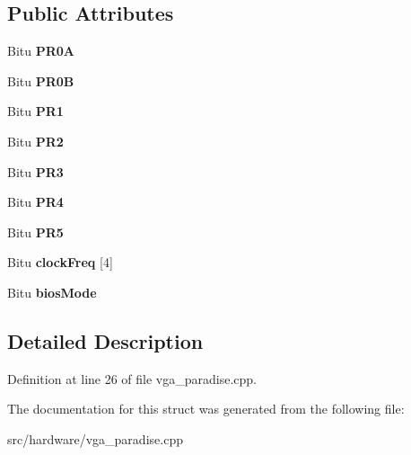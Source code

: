 \subsection*{Public Attributes}
\begin{DoxyCompactItemize}
\item 
\hypertarget{structSVGA__PVGA1A__DATA_a8ef7f27e409d76b2abf935961370d13b}{Bitu {\bfseries P\-R0\-A}}\label{structSVGA__PVGA1A__DATA_a8ef7f27e409d76b2abf935961370d13b}

\item 
\hypertarget{structSVGA__PVGA1A__DATA_a37c1495fe2b96b3e0ee3f22878b30aee}{Bitu {\bfseries P\-R0\-B}}\label{structSVGA__PVGA1A__DATA_a37c1495fe2b96b3e0ee3f22878b30aee}

\item 
\hypertarget{structSVGA__PVGA1A__DATA_aa7a26c60c2ff9aa714b28e5c9821519d}{Bitu {\bfseries P\-R1}}\label{structSVGA__PVGA1A__DATA_aa7a26c60c2ff9aa714b28e5c9821519d}

\item 
\hypertarget{structSVGA__PVGA1A__DATA_acbbcae9e5156735d741465f4a735bb66}{Bitu {\bfseries P\-R2}}\label{structSVGA__PVGA1A__DATA_acbbcae9e5156735d741465f4a735bb66}

\item 
\hypertarget{structSVGA__PVGA1A__DATA_a3cc150e78e21bde55742db1a38ac7310}{Bitu {\bfseries P\-R3}}\label{structSVGA__PVGA1A__DATA_a3cc150e78e21bde55742db1a38ac7310}

\item 
\hypertarget{structSVGA__PVGA1A__DATA_acd30e9d9480a518bb30f405f58bf12c1}{Bitu {\bfseries P\-R4}}\label{structSVGA__PVGA1A__DATA_acd30e9d9480a518bb30f405f58bf12c1}

\item 
\hypertarget{structSVGA__PVGA1A__DATA_aa118bde7e9692782048f17775ae1e111}{Bitu {\bfseries P\-R5}}\label{structSVGA__PVGA1A__DATA_aa118bde7e9692782048f17775ae1e111}

\item 
\hypertarget{structSVGA__PVGA1A__DATA_ab8cc8ae76d1dacf1e6e716aa9e06706c}{Bitu {\bfseries clock\-Freq} \mbox{[}4\mbox{]}}\label{structSVGA__PVGA1A__DATA_ab8cc8ae76d1dacf1e6e716aa9e06706c}

\item 
\hypertarget{structSVGA__PVGA1A__DATA_ad3ea17ec11267820afdfb927e65b645d}{Bitu {\bfseries bios\-Mode}}\label{structSVGA__PVGA1A__DATA_ad3ea17ec11267820afdfb927e65b645d}

\end{DoxyCompactItemize}


\subsection{Detailed Description}


Definition at line 26 of file vga\-\_\-paradise.\-cpp.



The documentation for this struct was generated from the following file\-:\begin{DoxyCompactItemize}
\item 
src/hardware/vga\-\_\-paradise.\-cpp\end{DoxyCompactItemize}
